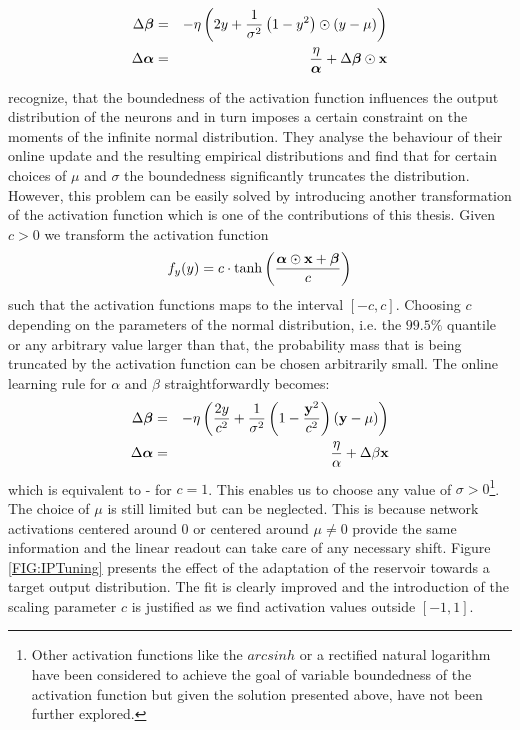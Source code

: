 \begin{eqnarray}
    \Delta {{\ensuremath \bm \beta}} & = & -\eta \left(2y + \frac{1}{\sigma^2} \left(1 - y^2\right)\odot(y-\mu)\right) \label{SchrauwenUpdate1}\\
    \Delta {{\ensuremath \bm \alpha}} & = & \frac{\eta}{{{\bm \alpha}}} + \Delta{{\ensuremath \bm \beta}} \odot {\bf x} \label{SchrauwenUpdate2}
\end{eqnarray}

\citep{Schrauwen2008} recognize, that the boundedness of the activation function influences the output distribution of the neurons and in turn imposes a certain constraint on the moments of the infinite normal distribution. They analyse the behaviour of their online update and the resulting empirical distributions and find that for certain choices of $\mu$ and $\sigma$ the boundedness significantly truncates the distribution. However, this problem can be easily solved by introducing another transformation of the activation function which is one of the contributions of this thesis. Given $c > 0$ we transform the activation function
\begin{equation}
    f_y(y) = c \cdot \text{tanh}\left(\frac{{{\bm \alpha}} \odot {\bf x} + {{\bm \beta}}}{c}\right)
\end{equation}
such that the activation functions maps to the interval $[-c, c]$. Choosing $c$ depending on the parameters of the normal distribution, i.e. the $99.5\%$ quantile or any arbitrary value larger than that, the probability mass that is being truncated by the activation function can be chosen arbitrarily small. The online learning rule for $\alpha$ and $\beta$ straightforwardly becomes:
\begin{eqnarray}
    \Delta {{\ensuremath \bm \beta}} & = & -\eta \left( \frac{2y}{c^2} + \frac{1}{\sigma^2} \left(1 - \frac{{\bf y}^2}{c^2}\right)({\bf y}-\mu)\right) \\
    \Delta {{\ensuremath \bm \alpha}} & = & \frac{\eta}{\alpha} + \Delta \beta {\bf x}
\end{eqnarray}
which is equivalent to - for $c = 1$. This enables us to choose any value of $\sigma > 0$\footnote{Other activation functions like the $arcsinh$ \citep{KIM2001ARCSINHActivation} or a rectified natural logarithm \citep{Liu2019NaturalLogarithmRectifiedAF} have been considered to achieve the goal of variable boundedness of the activation function but given the solution presented above, have not been further explored.}. The choice of $\mu$ is still limited but can be neglected. This is because network activations centered around $0$ or centered around $\mu \neq 0$ provide the same information and the linear readout can take care of any necessary shift. Figure \ref{FIG:IPTuning} presents the effect of the adaptation of the reservoir towards a target output distribution. The fit is clearly improved and the introduction of the scaling parameter $c$ is justified as we find activation values outside $\left[-1, 1\right]$.


